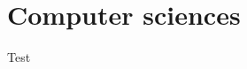 \documentclass[introduction.tex]{subfiles}
\begin{document}
\section{Computer sciences}

Test
\end{document}

